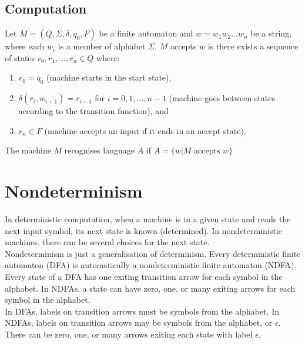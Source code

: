 \documentclass{article}
\begin{document}
\subsection{Computation}
Let $M = (Q, \Sigma, \delta, q_0, F)$ be a finite automaton and $w = w_1w_2...w_n$ be a string, where each $w_i$ is a member of alphabet $\Sigma$. $M$ accepts $w$ is there exists a sequence of states $r_0, r_1, ..., r_n \in Q$ where:
\begin{enumerate}
	\item $r_0 = q_0$ (machine starts in the start state),
	\item $\delta(r_i, w_{i+1}) = r_{i+1}$ for $i = 0, 1, ..., n-1$ (machine goes between states according to the transition function), and
	\item $r_n \in F$ (machine accepts an input if it ends in an accept state).
\end{enumerate}
The machine $M$ recognises language $A$ if $A = \{w|M\text{ accepts } w\}$

\section{Nondeterminism}
In deterministic computation, when a machine is in a given state and reads the next input symbol, its next state is known (determined). In nondeterministic machines, there can be several choices for the next state.\medskip
\\ Nondeterminism is just a generalisation of determinism. Every deterministic finite automaton (DFA) is automatically a nondeterministic finite automaton (NDFA).\medskip
\\ Every state of a DFA has one exiting transition arrow for each symbol in the alphabet. In NDFAs, a state can have zero, one, or many exiting arrows for each symbol in the alphabet.\medskip
\\ In DFAs, labels on transition arrows must be symbols from the alphabet. In NDFAs, labels on transition arrows may be symbols from the alphabet, or $\epsilon$. There can be zero, one, or many arrows exiting each state with label $\epsilon$.
\end{document}
